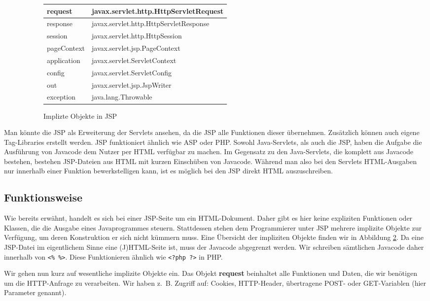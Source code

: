 \begin{figure}[h]
\begin{subfigure}[b]{.5\textwidth}
\begin{tabular}{|l|l|}
request	& javax.servlet.http.HttpServletRequest \\\hline
response & javax.servlet.http.HttpServletResponse \\\hline
session & javax.servlet.http.HttpSession \\\hline
pageContext	& javax.servlet.jsp.PageContext \\\hline
application	& javax.servlet.ServletContext \\\hline
config& javax.servlet.ServletConfig \\ \hline
out	& javax.servlet.jsp.JspWriter \\\hline
exception & java.lang.Throwable \\\hline
\end{tabular}
\caption{Implizte Objekte in JSP}
\label{fig:implicitObj}
\end{subfigure}
\caption{}
\end{figure}


Man könnte die JSP als Erweiterung der Servlets ansehen, da die JSP alle Funktionen dieser übernehmen. Zusätzlich können auch eigene Tag-Libraries erstellt werden. JSP funktioniert ähnlich wie ASP oder PHP. Sowohl Java-Servlets, als auch die JSP, haben die Aufgabe die Ausführung von Javacode dem Nutzer  per HTML verfügbar zu machen. Im Gegensatz zu den Java-Servlets, die komplett aus Javacode bestehen, bestehen JSP-Dateien aus HTML mit kurzen Einschüben von Javacode. Während man also bei den Servlets HTML-Ausgaben nur innerhalb einer Funktion bewerkstelligen kann, ist es möglich bei den JSP direkt HTML auszuschreiben.

\subsection{Funktionsweise}

Wie bereits erwähnt, handelt es sich bei einer JSP-Seite um ein HTML-Dokument. Daher gibt es hier keine expliziten Funktionen oder Klassen, die die Ausgabe eines Javaprogrammes steuern. Stattdessen stehen dem Programmierer unter JSP mehrere implizite Objekte zur Verfügung, um deren Konstruktion er sich nicht kümmern muss. Eine Übersicht der impliziten Objekte finden wir in Abbildung \ref{fig:implicitObj}. Da eine JSP-Datei im eigentlichem Sinne eine (J)HTML-Seite ist, muss der Javacode abgegrenzt werden. Wir schreiben sämtlichen Javacode daher innerhalb von \verb|<% %>|. Diese Funktionieren ähnlich wie \verb|<?php ?>| in PHP.

Wir gehen nun kurz auf wesentliche implizite Objekte ein. Das Objekt \textbf{request} beinhaltet alle Funktionen und Daten, die wir benötigen um die HTTP-Anfrage zu verarbeiten. Wir haben \mbox{z. B.} Zugriff auf: Cookies, HTTP-Header, übertragene POST- oder GET-Variablen (hier Parameter genannt).

